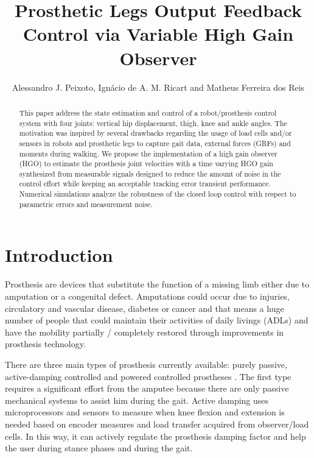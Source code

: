 \documentclass[letterpaper, 10 pt, journal, twocolumn]{IEEEtran}  %
\title{\LARGE \bf
Prosthetic Legs Output Feedback Control via Variable High Gain Observer}
\author{Alessandro J. Peixoto, %
        Ign\'{a}cio de A. M. Ricart and
        Matheus Ferreira dos Reis %
}
\theoremstyle{plain}
\theoremstyle{definition}
\theoremstyle{remark}
\begin{document}

\maketitle
\thispagestyle{empty}
\pagestyle{empty}
\begin{abstract}%
This paper address the state estimation and control of a robot/prosthesis control system with four joints: vertical hip displacement, thigh, knee and ankle angles. The motivation was inspired by several drawbacks regarding the usage of load cells and/or sensors in robots and prosthetic legs to capture gait data, external forces (GRFs) and moments during walking. We propose the implementation of a high gain observer (HGO)  to estimate the  prosthesis joint velocities with a time varying HGO gain synthesized from measurable signals designed to reduce the amount of noise in the control effort while keeping an acceptable tracking error transient performance. Numerical simulations analyze the robustness of the closed loop control with respect
to parametric errors and measurement noise.
\end{abstract}
\section{Introduction}

Prosthesis are devices that substitute the function of a missing limb either due to amputation or a congenital defect. Amputations could occur due to injuries, circulatory and vascular disease, diabetes or cancer and that means a huge number of people that could maintain their activities of daily livings (ADLs) and have the mobility partially / completely restored through improvements in prosthesis technology. 

There are three main types of prosthesis currently available: purely passive, active-damping controlled and powered controlled prostheses \cite{Awad2017}. The first type requires a significant effort from the amputee because there are only passive mechanical systems to assist him during the gait. Active damping uses microprocessors and sensors to measure when knee flexion and extension is needed based on encoder measures and load transfer acquired from observer/load cells. In this way, it can actively regulate the prosthesis damping factor and help the user during stance phases and during the gait.
\end{document}
